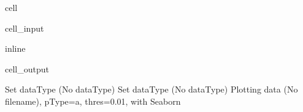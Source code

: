 \documentclass[letterpaper,table,10pt,english]{jupyterBook}
\begin{document}
\begin{sphinxuseclass}{cell}\begin{sphinxVerbatimInput}

\begin{sphinxuseclass}{cell_input}
\begin{sphinxVerbatim}[commandchars=\\\{\}]
 inline
      \PYG{p}{[}\PYG{p}{]}\PYG{p}{[}\PYG{p}{]}\PYG{p}{[}\PYG{p}{]} \PYG{p}{[}\PYG{p}{]}    
\end{sphinxVerbatim}

\end{sphinxuseclass}\end{sphinxVerbatimInput}
\begin{sphinxVerbatimOutput}

\begin{sphinxuseclass}{cell_output}
\begin{sphinxVerbatim}[commandchars=\\\{\}]
Set dataType (No dataType)
Set dataType (No dataType)
Plotting data (No filename), pType=a, thres=0.01, with Seaborn
\end{sphinxVerbatim}

\noindent{}

\end{sphinxuseclass}\end{sphinxVerbatimOutput}

\end{sphinxuseclass}
\end{document}
